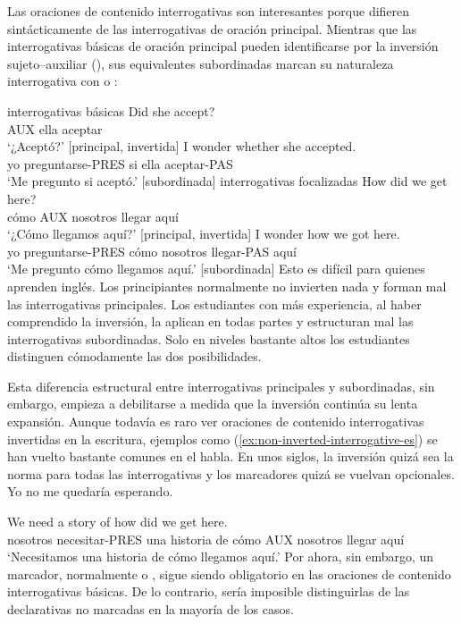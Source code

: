 \label{sec:sub-interrog-es}

Las oraciones de contenido interrogativas son interesantes porque difieren sintácticamente de las interrogativas de oración principal. Mientras que las interrogativas básicas de oración principal pueden identificarse por la inversión sujeto--auxiliar (), sus equivalentes subordinadas marcan su naturaleza interrogativa con  o :

\ea interrogativas básicas\label{ex:int-sub-es}
    \ea \gll Did she accept?\\
        AUX ella aceptar\\
    \glt `¿Aceptó?' [principal, invertida]
    \ex \gll I wonder {\ob}whether she accepted{\cb}.\\
        yo preguntarse-PRES si ella aceptar-PAS\\
    \glt `Me pregunto si aceptó.' [subordinada]
    \z
\z
\ea interrogativas focalizadas
    \ea \gll How did we get here?\\
        cómo AUX nosotros llegar aquí\\
    \glt `¿Cómo llegamos aquí?' [principal, invertida]
    \ex \gll I wonder {\ob}how we got here{\cb}.\\
        yo preguntarse-PRES cómo nosotros llegar-PAS aquí\\
    \glt `Me pregunto cómo llegamos aquí.' [subordinada]
    \z
\z
Esto es difícil para quienes aprenden inglés. Los principiantes normalmente no invierten nada y forman mal las interrogativas principales. Los estudiantes con más experiencia, al haber comprendido la inversión, la aplican en todas partes y estructuran mal las interrogativas subordinadas. Solo en niveles bastante altos los estudiantes distinguen cómodamente las dos posibilidades.

Esta diferencia estructural entre interrogativas principales y subordinadas, sin embargo, empieza a debilitarse a medida que la inversión continúa su lenta expansión. Aunque todavía es raro ver oraciones de contenido interrogativas invertidas en la escritura, ejemplos como (\ref{ex:non-inverted-interrogative-es}) se han vuelto bastante comunes en el habla. En unos siglos, la inversión quizá sea la norma para todas las interrogativas y los marcadores quizá se vuelvan opcionales. Yo no me quedaría esperando.

\ea\label{ex:non-inverted-interrogative-es}
\gll We need a story of {\ob}how did we get here{\cb}.\\
    nosotros necesitar-PRES una historia de cómo AUX nosotros llegar aquí\\
\glt `Necesitamos una historia de cómo llegamos aquí.'
\z
Por ahora, sin embargo, un marcador, normalmente  o , sigue siendo obligatorio en las oraciones de contenido interrogativas básicas. De lo contrario, sería imposible distinguirlas de las declarativas no marcadas en la mayoría de los casos.

